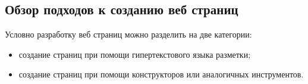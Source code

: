 \subsection{Обзор подходов к созданию веб страниц}

Условно разработку веб страниц можно разделить на две категории:
\begin{itemize}
	\item создание страниц при помощи гипертекстового языка разметки;
	\item создание страниц при помощи конструкторов или аналогичных инструментов.
\end{itemize}